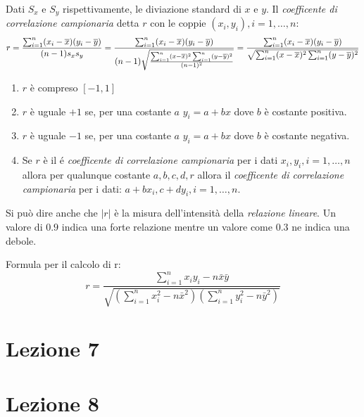 \documentclass{article}
\begin{document}
\begin{tcolorbox}
  Dati $S_x$ e $S_y$ rispettivamente, le diviazione standard di $x$ e $y$. Il \textit{coefficente di correlazione campionaria} detta $r$ con le coppie $(x_i,y_i),i=1,\dots,n$: $$r=\frac{\sum_{i=1}^n(x_i-\overline{x})(y_i-\overline{y})}{(n-1)s_xs_y}= \\ \frac{
\sum_{i=1}^n(x_i-\overline{x})(y_i-\overline{y})}{(n-1)\sqrt{\frac{\sum_{i=1}^n(x-\overline{x})^2 \sum_{i=1}^n(y-\overline{y})^2}{(n-1)^2}  }}= \frac{
\sum_{i=1}^n(x_i-\overline{x})(y_i-\overline{y})}{\sqrt{\sum_{i=1}^n(x-\overline{x})^2 \sum_{i=1}^n(y-\overline{y})^2}}$$ 


\begin{enumerate}
  \item $r$ è compreso $[-1,1]$ 
  \item $r$ è uguale $+1$ se, per una costante $a$ $y_i=a+bx$ dove $b$ è costante positiva.
  \item $r$ è uguale $-1$ se, per una costante $a$ $y_i=a+bx$ dove $b$ è costante negativa.
  \item Se $r$ è il é \textit{coefficente di correlazione campionaria} per i dati $x_i,y_i, i=1,\dots,n$ allora per qualunque costante $a,b,c,d,r$ allora il \textit{coefficente di correlazione campionaria} per i dati: $a+bx_i,c+dy_i, i=1,\dots,n$. 

\end{enumerate}

Si può dire anche che $|r|$ è la misura dell'intensità della \textit{relazione lineare}. Un valore di $0.9$ indica una forte relazione mentre un valore come $0.3$ ne indica una debole. 



\end{tcolorbox}

Formula per il calcolo di r: 
  $$r = \frac{\sum_{i=1}^{n} x_i y_i - n \bar{x} \bar{y}}{\sqrt{\left(\sum_{i=1}^{n} x_i^2 - n \bar{x}^2\right) \left(\sum_{i=1}^{n} y_i^2 - n \bar{y}^2\right)}}$$



\section*{Lezione 7}

\section*{Lezione 8}
\end{document}
